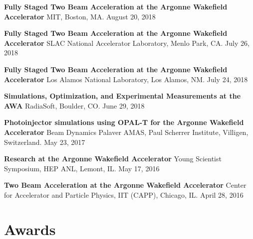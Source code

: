 \documentclass[11pt,a4paper,sans]{moderncv}        %
\begin{document}
\textbf{Fully Staged Two Beam Acceleration at the Argonne Wakefield Accelerator}\newline
MIT, Boston, MA. August 20, 2018 
\vspace{0.3em}

\textbf{Fully Staged Two Beam Acceleration at the Argonne Wakefield Accelerator}\newline
SLAC National Accelerator Laboratory, Menlo Park, CA. July 26, 2018 
\vspace{0.3em}

\textbf{Fully Staged Two Beam Acceleration at the Argonne Wakefield Accelerator}\newline
Los Alamos National Laboratory, Los Alamos, NM. July 24, 2018 
\vspace{0.3em}

\textbf{Simulations, Optimization, and Experimental Measurements at the AWA}\newline
RadiaSoft, Boulder, CO. June 29, 2018 
\vspace{0.3em}

\textbf{Photoinjector simulations using OPAL-T for the Argonne Wakefield Accelerator}\newline
Beam Dynamics Palaver AMAS, Paul Scherrer Institute, Villigen, Switzerland. May 23, 2017 
\vspace{0.3em}

\textbf{Research at the Argonne Wakefield Accelerator}\newline
Young Scientist Symposium, HEP ANL, Lemont, IL. May 17, 2016 
\vspace{0.3em}

\textbf{Two Beam Acceleration at the Argonne Wakefield Accelerator}\newline
Center for Accelerator and Particle Physics, IIT (CAPP), Chicago, IL. April 28, 2016 

\newpage
\section{Awards}

\end{document}
